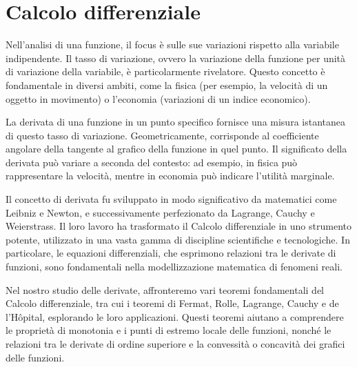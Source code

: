 \documentclass{book}
\begin{document}
\chapter{Calcolo differenziale}
Nell'analisi di una funzione, il focus è sulle sue variazioni rispetto alla variabile indipendente. Il tasso di variazione, ovvero la variazione della funzione per unità di variazione della variabile, è particolarmente rivelatore. Questo concetto è fondamentale in diversi ambiti, come la fisica (per esempio, la velocità di un oggetto in movimento) o l'economia (variazioni di un indice economico).

La derivata di una funzione in un punto specifico fornisce una misura istantanea di questo tasso di variazione. Geometricamente, corrisponde al coefficiente angolare della tangente al grafico della funzione in quel punto. Il significato della derivata può variare a seconda del contesto: ad esempio, in fisica può rappresentare la velocità, mentre in economia può indicare l'utilità marginale.

Il concetto di derivata fu sviluppato in modo significativo da matematici come Leibniz e Newton, e successivamente perfezionato da Lagrange, Cauchy e Weierstrass. Il loro lavoro ha trasformato il Calcolo differenziale in uno strumento potente, utilizzato in una vasta gamma di discipline scientifiche e tecnologiche. In particolare, le equazioni differenziali, che esprimono relazioni tra le derivate di funzioni, sono fondamentali nella modellizzazione matematica di fenomeni reali.

Nel nostro studio delle derivate, affronteremo vari teoremi fondamentali del Calcolo differenziale, tra cui i teoremi di Fermat, Rolle, Lagrange, Cauchy e de l'Hôpital, esplorando le loro applicazioni. Questi teoremi aiutano a comprendere le proprietà di monotonia e i punti di estremo locale delle funzioni, nonché le relazioni tra le derivate di ordine superiore e la convessità o concavità dei grafici delle funzioni.
\end{document}
